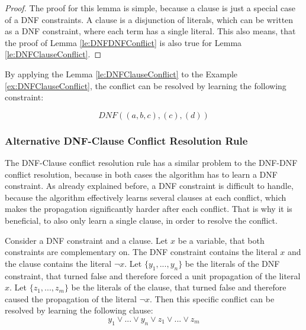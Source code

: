 \begin{proof}
The proof for this lemma is simple, because a clause is just a special case of a DNF constraints. A clause is a disjunction of literals, which can be written as a DNF constraint, where each term has a single literal. This also means, that the proof of Lemma \ref{le:DNFDNFConflict} is also true for Lemma \ref{le:DNFClauseConflict}.
\end{proof}

By applying the Lemma \ref{le:DNFClauseConflict} to the Example \ref{ex:DNFClauseConflict}, the conflict can be resolved by learning the following constraint:

\begin{leftbar}
\begin{displaymath}
DNF((a,b,c),(c),(d))
\end{displaymath}
\end{leftbar}

\subsubsection{Alternative DNF-Clause Conflict Resolution Rule}

The DNF-Clause conflict resolution rule has a similar problem to the DNF-DNF conflict resolution, because in both cases the algorithm has to learn a DNF constraint. As already explained before, a DNF constraint is difficult to handle, because the algorithm effectively learns several clauses at each conflict, which makes the propagation significantly harder after each conflict. That is why it is beneficial, to also only learn a single clause, in order to resolve the conflict.

\begin{lemma}
\begin{leftbar}
Consider a DNF constraint and a clause. Let $x$ be a variable, that both constraints are complementary on. The DNF constraint contains the literal $x$ and the clause contains the literal $\neg x$. Let $\{y_1,...,y_n\}$ be the literals of the DNF constraint, that turned false and therefore forced a unit propagation of the literal $x$. Let $\{z_1,...,z_m\}$ be the literals of the clause, that turned false and therefore caused the propagation of the literal $\neg x$. Then this specific conflict can be resolved by learning the following clause:
\begin{displaymath}
y_1 \vee ... \vee y_n \vee z_1 \vee ... \vee z_m
\end{displaymath}
\end{leftbar}
\label{le:DNFClauseConflictAlt}
\end{lemma}


